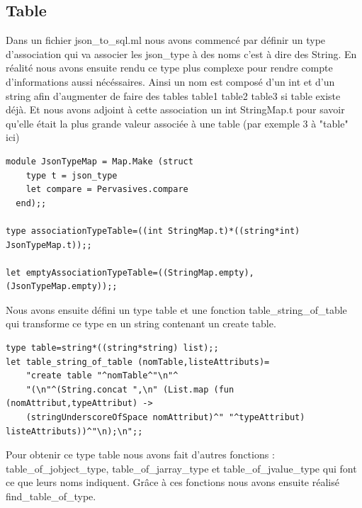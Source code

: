 \documentclass{report}
\begin{document}
\subsection{Table}
\par
Dans un fichier json\_to\_sql.ml nous avons commencé par définir un type d'association qui va associer les json\_type à des noms c'est à dire des String. En réalité nous avons ensuite rendu ce type plus complexe pour rendre compte d'informations aussi nécéssaires. Ainsi un nom est composé d'un int et d'un string afin d'augmenter de faire des tables table1 table2 table3 si table existe déjà. Et nous avons adjoint à cette association un int StringMap.t pour savoir qu'elle était la plus grande valeur associée à une table (par exemple 3 à "table" ici)

\begin{verbatim}
module JsonTypeMap = Map.Make (struct
    type t = json_type
    let compare = Pervasives.compare
  end);;

type associationTypeTable=((int StringMap.t)*((string*int) JsonTypeMap.t));;

let emptyAssociationTypeTable=((StringMap.empty),(JsonTypeMap.empty));;
\end{verbatim}

Nous avons ensuite défini un type table et une fonction table\_string\_of\_table qui transforme ce type en un string contenant un create table.
\\
\begin{verbatim}
type table=string*((string*string) list);;
let table_string_of_table (nomTable,listeAttributs)=
	"create table "^nomTable^"\n"^
	"(\n"^(String.concat ",\n" (List.map (fun (nomAttribut,typeAttribut) ->
	(stringUnderscoreOfSpace nomAttribut)^" "^typeAttribut) listeAttributs))^"\n);\n";;
\end{verbatim}

Pour obtenir ce type table nous avons fait d'autres fonctions : table\_of\_jobject\_type, table\_of\_jarray\_type et table\_of\_jvalue\_type qui font ce que leurs noms indiquent.
Grâce à ces fonctions nous avons ensuite réalisé find\_table\_of\_type.
\end{document}
